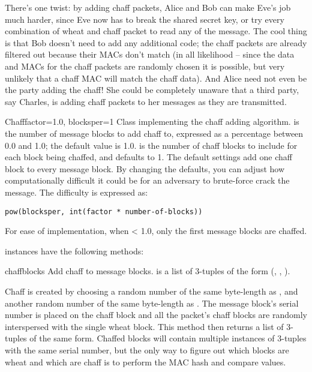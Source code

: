 \documentclass{howto}
\begin{document}
There's one twist: by adding chaff packets, Alice and Bob can make Eve's job
much harder, since Eve now has to break the shared secret key, or try every
combination of wheat and chaff packet to read any of the message.  The cool
thing is that Bob doesn't need to add any additional code; the chaff packets
are already filtered out because their MACs don't match (in all likelihood --
since the data and MACs for the chaff packets are randomly chosen it is
possible, but very unlikely that a chaff MAC will match the chaff data).  And
Alice need not even be the party adding the chaff!  She could be completely
unaware that a third party, say Charles, is adding chaff packets to her
messages as they are transmitted.

\begin{classdesc}{Chaff}{factor=1.0, blocksper=1}
Class implementing the chaff adding algorithm. 
 is the number of message blocks 
            to add chaff to, expressed as a percentage between 0.0 and 1.0; the default value is 1.0.
 is the number of chaff blocks to include for each block
            being chaffed, and defaults to 1.  The default settings 
add one chaff block to every
            message block.  By changing the defaults, you can adjust how
            computationally difficult it could be for an adversary to
            brute-force crack the message.  The difficulty is expressed as:

\begin{verbatim}
pow(blocksper, int(factor * number-of-blocks))
\end{verbatim}

For ease of implementation, when  < 1.0, only the first
 message blocks are chaffed.
\end{classdesc}

 instances have the following methods:

\begin{methoddesc}{chaff}{blocks}
Add chaff to message blocks.   is a list of 3-tuples of the
form (, , ).

Chaff is created by choosing a random number of the same
byte-length as , and another random number of the same
byte-length as .  The message block's serial number is placed
on the chaff block and all the packet's chaff blocks are randomly
interspersed with the single wheat block.  This method then
returns a list of 3-tuples of the same form.  Chaffed blocks will
contain multiple instances of 3-tuples with the same serial
number, but the only way to figure out which blocks are wheat and
which are chaff is to perform the MAC hash and compare values.
\end{methoddesc}
\end{document}

